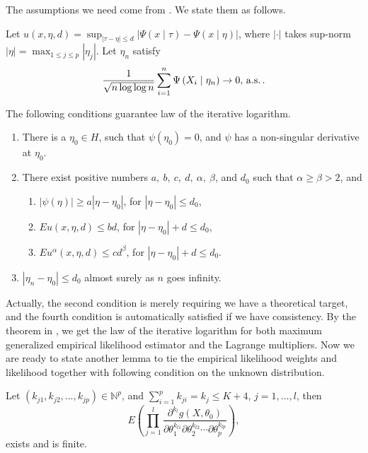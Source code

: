 The assumptions we need come from \citet{he1995law}. We state them
as follows.
\begin{assumption}
\label{assu:lil-m-est}
Let $u\left(x,\eta,d\right)=\sup_{\left|\tau-\eta\right|\le d}\left|\Psi\left(x\mid\tau\right)-\Psi\left(x\mid\eta\right)\right|$,
where $\left|\cdot\right|$ takes sup-norm $\left|\eta\right|=\max_{1\le j\le p}\left|\eta_{j}\right|$.
Let $\eta_{n}$ satisfy 
\[
\frac{1}{\sqrt{n\log\log n}}\sum_{i=1}^{n}\Psi\left(X_{i}\mid\eta_{n}\right)\rightarrow0,\,\mathrm{a.s.}\,.
\]
\end{assumption}
The following conditions guarantee law of the iterative logarithm.
\begin{assumption}
\label{assu:lil-m-est-2}
\begin{enumerate}

\item There is a $\eta_{0}\in H$, such that $\psi\left(\eta_{0}\right)=0$,
and $\psi$ has a non-singular derivative at $\eta_{0}$.
\item There exist positive numbers $a,\: b,\: c,\: d,\:\alpha,\:\beta$,
and $d_{0}$ such that $\alpha\ge\beta>2$, and 

\begin{enumerate}
\item $\left|\psi\left(\eta\right)\right|\ge a\left|\eta-\eta_{0}\right|$,
for $\left|\eta-\eta_{0}\right|\le d_{0}$,
\item $Eu\left(x,\eta,d\right)\le bd$, for $\left|\eta-\eta_{0}\right|+d\le d_{0}$,
\item $Eu^{\alpha}\left(x,\eta,d\right)\le cd^{\beta}$, for $\left|\eta-\eta_{0}\right|+d\le d_{0}$.
\end{enumerate}
\item $\left|\eta_{n}-\eta_{0}\right|\le d_{0}$ almost surely as $n$ goes
infinity.

\end{enumerate}
\end{assumption}
Actually, the second condition is merely requiring we have a theoretical
target, and the fourth condition is automatically satisfied if we
have consistency. By the theorem in \citet{he1995law},
we get the law of the iterative logarithm for both maximum generalized
empirical likelihood estimator and the Lagrange multipliers. Now we
are ready to state another lemma to tie the empirical likelihood weights
and likelihood together with following condition on the unknown distribution.
\begin{assumption}
\label{assu:finite-theoretic-moment} Let $\left(k_{j1},k_{j2},\ldots,k_{jp}\right)\in\mathbb{N}^{p}$,
and $\sum_{i=1}^{p}k_{ji}=k_{j}\le K+4$, $j=1,\ldots,l$, then 
\[
E\left(\prod_{j=1}^{l}\frac{\partial^{k_{l}}g\left(X,\theta_{0}\right)}{\partial\theta_{1}^{k_{l1}}\partial\theta_{2}^{k_{l2}}\cdots\partial\theta_{p}^{k_{lp}}}\right),
\]
exists and is finite.\end{assumption}
